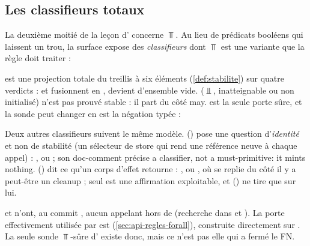 \subsection{Les classifieurs totaux}

La deuxième moitié de la leçon d' concerne $\Top$. Au lieu de prédicats booléens qui laissent un trou, la surface expose des \emph{classifieurs} dont $\Top$ est une variante que la règle doit traiter :


 est une projection totale du treillis à six éléments  (\cref{def:stabilite}) sur quatre verdicts :  et  fusionnent en ,  devient  d'ensemble vide.  ($\Bot$, inatteignable ou non initialisé) n'est pas \og prouvé stable\fg{} : il part du côté may.  est la seule porte sûre, et la sonde \og peut changer\fg{} en est la négation typée :


Deux autres classifieurs suivent le même modèle.  () pose une question d'\emph{identité} et non de stabilité (un sélecteur de store qui rend une référence neuve à chaque appel) : ,  ou  ; son doc-comment précise \og a classifier, not a must-primitive: it mints nothing\fg.  () dit ce qu'un corps d'effet retourne : ,  ou , où  se replie du côté \og il y a peut-être un cleanup\fg{} ; seul  est une affirmation exploitable, et  (\Warning) ne tire que sur lui.

\begin{piege}
 et  n'ont, au commit \snapshotCommit, aucun appelant hors de  (recherche dans  et ). La porte effectivement utilisée par  est  (\cref{sec:api-regles-forall}), construite directement sur . La \og seule sonde $\Top$-sûre\fg{} d' existe donc, mais ce n'est pas elle qui a fermé le FN.
\end{piege}

